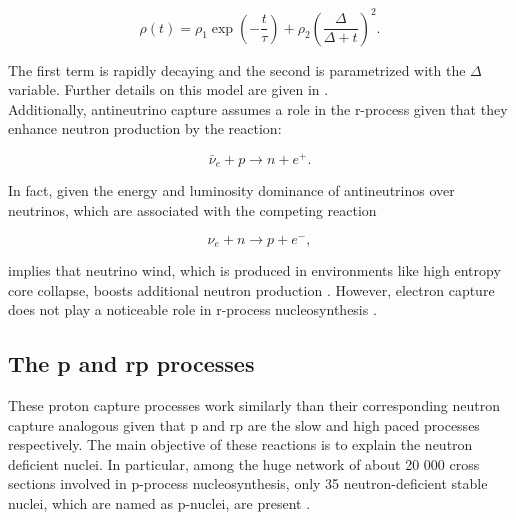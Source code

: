 \documentclass[openany]{book}
\begin{document}
\begin{equation}\label{eq:reaction_density}
	\rho(t) = \rho_1 \exp \left( - \frac{t}{\tau}\right) + \rho_2 \left( \frac{\Delta}{\Delta + t}\right)^2.
\end{equation}

The first term is rapidly decaying and the second is parametrized with the $\Delta$ variable. Further details on this model are given in \cite{meyer_2002}. \\

Additionally, antineutrino capture assumes a role in the r-process given that they enhance neutron production by the reaction:

\begin{equation}\label{eq:reaction_antineutrino_hatne}
	\bar {\nu}_{e} + p \rightarrow n + e^{+}.
\end{equation}

In fact, given the energy and luminosity dominance of antineutrinos over neutrinos, which are associated with the competing reaction 

\begin{equation}\label{eq:reaction_antineutrino_ne}
	\nu_e + n \rightarrow p + e^{-},
\end{equation}

implies that neutrino wind, which is produced in environments like high entropy core collapse, boosts additional neutron production \cite{meyer_mclaughlin_fuller_1998}. However, electron capture does not play a noticeable role in r-process nucleosynthesis \cite{langanke_martinez-pinedo_zegers_2021}. \\

\subsection{The p and rp processes} \label{sub:pProcesses}

These proton capture processes work similarly than their corresponding neutron capture analogous given that p and rp are the slow and high paced processes respectively. The main objective of these reactions is to explain the neutron deficient nuclei. In particular, among the huge network of about  20 000 cross sections involved in p-process nucleosynthesis, only 35 neutron-deficient stable nuclei, which are named as p-nuclei, are present \cite{harissopulos_lagoyannis_spyrou_zarkadas_galanopoulos_perdikakis_becker_rolfs_strieder_kunz_et_2005}. \\
\end{document}
